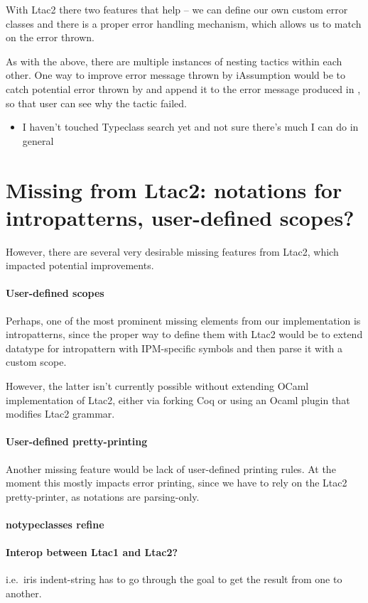 With Ltac2 there two features that help -- we can define our own custom error classes and there is a proper error handling mechanism, which allows us to match on the error thrown.

As with the  above, there are multiple instances of nesting tactics within each other.
One way to improve error message thrown by iAssumption would be to catch potential error thrown by  and append it to the error message produced in , so that user can see why the tactic failed.


\begin{itemize}
\item {} I haven't touched Typeclass search yet and not sure there's much I can do in general
\end{itemize}

\section{Missing from Ltac2: notations for intropatterns, user-defined scopes?}

However, there are several very desirable missing features from Ltac2, which impacted potential improvements.

\paragraph{User-defined scopes}

Perhaps, one of the most prominent missing elements from our implementation is intropatterns, since the proper way to define them with Ltac2 would be to extend datatype for intropattern with IPM-specific symbols and then parse it with a custom scope.

However, the latter isn't currently possible without extending OCaml implementation of Ltac2, either via forking Coq or using an Ocaml plugin that modifies Ltac2 grammar.

\paragraph{User-defined pretty-printing}
Another missing feature would be lack of user-defined printing rules.
At the moment this mostly impacts error printing, since we have to rely on the Ltac2 pretty-printer, as notations are parsing-only.

\paragraph{notypeclasses refine}

\paragraph{Interop between Ltac1 and Ltac2?}
i.e.\ iris indent-string has to go through the goal to get the result from one to another.

